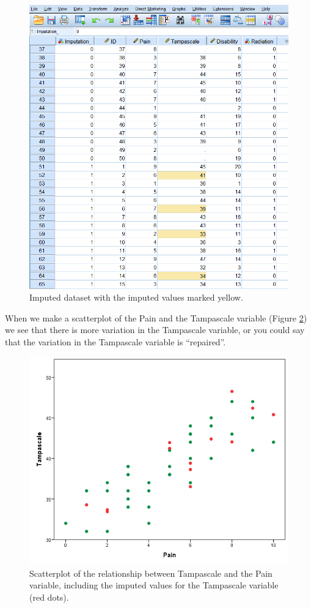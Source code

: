 \documentclass[]{book}
\begin{document}
\begin{figure}

{\centering \includegraphics[width=0.7\linewidth]{images/fig3.23} 

}

\caption{Imputed dataset with the imputed values marked yellow.}\label{fig:fig3-23}
\end{figure}

When we make a scatterplot of the Pain and the Tampascale variable
(Figure \ref{fig:fig3-24}) we see that there is more variation in the
Tampascale variable, or you could say that the variation in the
Tampascale variable is ``repaired''.

\begin{figure}

{\centering \includegraphics[width=0.7\linewidth]{images/fig3.24} 

}

\caption{Scatterplot of the relationship between Tampascale and the Pain variable, including the imputed values for the Tampascale variable (red dots).}\label{fig:fig3-24}
\end{figure}
\end{document}
